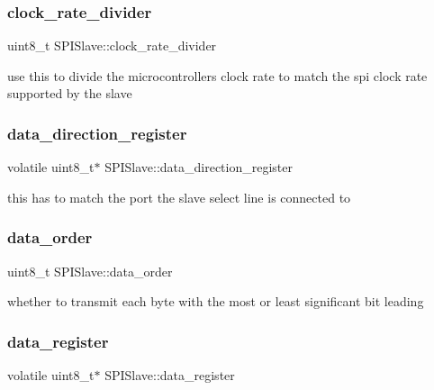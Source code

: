 \subsubsection{\texorpdfstring{clock\+\_\+rate\+\_\+divider}{clock\_rate\_divider}}
{\footnotesize\ttfamily uint8\+\_\+t S\+P\+I\+Slave\+::clock\+\_\+rate\+\_\+divider}

use this to divide the microcontrollers clock rate to match the spi clock rate supported by the slave \mbox{\label{structSPISlave_abf7a375633e77b232e1cbb12a0eb002d}} 
\subsubsection{\texorpdfstring{data\+\_\+direction\+\_\+register}{data\_direction\_register}}
{\footnotesize\ttfamily volatile uint8\+\_\+t$\ast$ S\+P\+I\+Slave\+::data\+\_\+direction\+\_\+register}

this has to match the port the slave select line is connected to \mbox{\label{structSPISlave_ae7de4403de0e6393e4f2a8a34b98c845}} 
\subsubsection{\texorpdfstring{data\+\_\+order}{data\_order}}
{\footnotesize\ttfamily uint8\+\_\+t S\+P\+I\+Slave\+::data\+\_\+order}

whether to transmit each byte with the most or least significant bit leading \mbox{\label{structSPISlave_abbc4e8f0ccaa89da51ca0e4ff24ad7e9}} 
\subsubsection{\texorpdfstring{data\+\_\+register}{data\_register}}
{\footnotesize\ttfamily volatile uint8\+\_\+t$\ast$ S\+P\+I\+Slave\+::data\+\_\+register}

